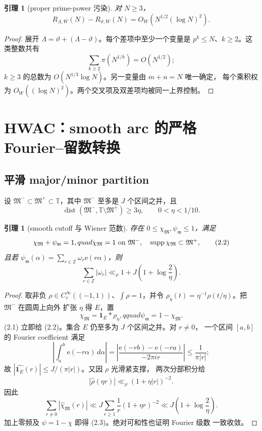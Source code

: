 \documentclass[11pt,a4paper]{ctexart}
\newtheorem{lemma}[theorem]{引理}
\theoremstyle{definition}
\newcommand{\T}{\mathbb T}
\newcommand{\e}{\mathrm e}
\newcommand{\1}{\mathbf 1}
\begin{document}
\begin{lemma}[proper prime-power 污染]
对 $N\ge3$，
\[
R_{\Lambda,W}(N)-R_{\vartheta,W}(N)
=O_W\!\left(N^{1/2}(\log N)^2\right).                  \tag{1.5}
\]
\end{lemma}

\begin{proof}
展开 $\Lambda=\vartheta+(\Lambda-\vartheta)$。每个差项中至少一个变量是
$p^k\le N$、$k\ge2$。这类整数共有
\[
\sum_{k\ge2}\pi(N^{1/k})=O(N^{1/2});
\]
$k\ge3$ 的总数为 $O(N^{1/3}\log N)$。另一变量由 $m+n=N$ 唯一确定，
每个乘积权为 $O_W((\log N)^2)$。两个交叉项及双差项均被同一上界控制。
\end{proof}

\section{HWAC：smooth arc 的严格 Fourier--留数转换}

\subsection{平滑 major/minor partition}

设 $\mathfrak M^-\subset\mathfrak M^+\subset\T$，其中 $\mathfrak M^-$
至多是 $J$ 个区间之并，且
\[
\operatorname{dist}(\mathfrak M^-,\T\setminus\mathfrak M^+)\ge3\eta,
\qquad 0<\eta<1/10.                                    \tag{2.1}
\]

\begin{lemma}[smooth cutoff 与 Wiener 范数]
存在 $0\le\chi_{\mathfrak M},\psi_{\mathfrak m}\le1$，满足
\[
\chi_{\mathfrak M}+\psi_{\mathfrak m}=1,quad
\chi_{\mathfrak M}=1\ \hbox{on }\mathfrak M^-,\quad
\operatorname{supp}\chi_{\mathfrak M}\subset\mathfrak M^+,             \tag{2.2}
\]
且若
\(
\psi_{\mathfrak m}(\alpha)=\sum_{r\in\mathbb Z}\omega_r\e(r\alpha)
\)，则
\[
\sum_{r\in\mathbb Z}|\omega_r|
\ll_\rho 1+J\left(1+\log\frac2\eta\right).             \tag{2.3}
\]
\end{lemma}

\begin{proof}
取非负 $\rho\in C_c^\infty((-1,1))$、$\int\rho=1$，并令
$\rho_\eta(t)=\eta^{-1}\rho(t/\eta)$。把 $\mathfrak M^-$ 在圆周上向外
扩张 $\eta$ 得 $E$，置
\[
\chi_{\mathfrak M}=\1_E*\rho_\eta,qquad
\psi_{\mathfrak m}=1-\chi_{\mathfrak M}.               \tag{2.4}
\]
(2.1) 立即给 (2.2)。集合 $E$ 仍至多为 $J$ 个区间之并。对 $r\ne0$，
一个区间 $[a,b]$ 的 Fourier coefficient 满足
\[
\left|\int_a^b\e(-r\alpha)\,d\alpha\right|
=\left|\frac{\e(-rb)-\e(-ra)}{-2\pi ir}\right|
\le\frac1{\pi|r|};                                    \tag{2.5}
\]
故 $|\widehat{\1_E}(r)|\le J/(\pi|r|)$。又因 $\rho$ 光滑紧支撑，
两次分部积分给
\[
|\widehat\rho(\eta r)|\ll_\rho(1+\eta|r|)^{-2}.       \tag{2.6}
\]
因此
\[
\sum_{r\ne0}|\widehat\chi_{\mathfrak M}(r)|
\ll J\sum_{r\ge1}\frac1r(1+\eta r)^{-2}
\ll J\left(1+\log\frac2\eta\right).                  \tag{2.7}
\]
加上零频及 $\psi=1-\chi$ 即得 (2.3)。绝对可和性也证明 Fourier 级数
一致收敛。
\end{proof}
\end{document}
